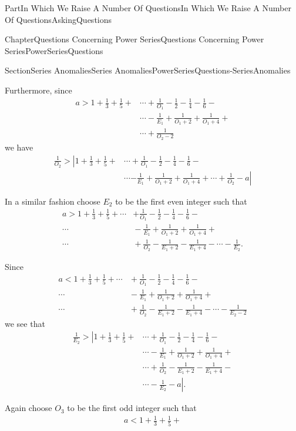 \documentclass[oneside,10pt,]{book}
\numberwithin{equation}{part}
\newcommand{\lt}{<}
\newcommand{\gt}{>}
\newcommand{\amp}{&}
\begin{document}
\begin{partptx}{Part}{In Which We Raise A Number Of Questions}{}{In Which We Raise A Number Of Questions}{}{}{AskingQuestions}
\begin{chapterptx}{Chapter}{Questions Concerning Power Series}{}{Questions Concerning Power Series}{}{}{PowerSeriesQuestions}
\begin{sectionptx}{Section}{Series Anomalies}{}{Series Anomalies}{}{}{PowerSeriesQuestions-SeriesAnomalies}
%
\par
Furthermore, since%
\begin{align*}
a\gt 1+\frac{1}{3}+\frac{1}{5}+\amp{}\cdots+\frac{1}{O_1}-\frac{1}{2}-\frac{1}{4}-
\frac{1}{6}-\\
\amp{}\cdots-\frac{1}{E_1}+\frac{1}{O_1+2}+\frac{1}{O_1+4}+\\
\amp{}\cdots+ \frac{1}{O_2-2}
\end{align*}
we have%
\begin{align*}
\frac{1}{O_2} \gt \left|1+\frac{1}{3}+\frac{1}{5}+\right.\amp{}\cdots+\frac{1}{O_1}-\frac{1}{2}-\frac{1}{4}- \frac{1}{6}-\\
\amp\cdots \left.-\frac{1}{E_1}+\frac{1}{O_1+2}+\frac{1}{O_1+4}+\cdots+ \frac{1}{O_2}-a\right|
\end{align*}
%
\par
In a similar fashion choose \(E_2\) to be the first even integer such that%
\begin{align*}
a\gt 1+\frac{1}{3}+\frac{1}{5}+\cdots\amp +\frac{1}{O_1}-\frac{1}{2}- \frac{1}{4}-\frac{1}{6}-\\
\cdots\amp{} -\frac{1}{E_1}+ \frac{1}{O_1+2}+\frac{1}{O_1+4}+\\
\cdots\amp{}+\frac{1}{O_2}-\frac{1}{E_1+2}-\frac{1}{E_1+4}- \cdots{}-\frac{1}{E_2}\text{.}
\end{align*}
%
\par
Since%
\begin{align*}
a\lt 1+\frac{1}{3}+\frac{1}{5} +\cdots\amp{}+\frac{1}{O_1}-\frac{1}{2}- \frac{1}{4}-\frac{1}{6}-\\
\cdots\amp{}-\frac{1}{E_1}+ \frac{1}{O_1+2}+\frac{1}{O_1+4}+\\
\cdots\amp{}+\frac{1}{O_2}- \frac{1}{E_1+2}-\frac{1}{E_1+4}-\cdots-\frac{1}{E_2-2}
\end{align*}
we see that%
\begin{align*}
\frac{1}{E_2} \gt{}
\left|1+\frac{1}{3}\right.+\frac{1}{5}+
\amp \cdots+\frac{1}{O_1}-\frac{1}{2}-
\frac{1}{4}-\frac{1}{6}-\\
\amp{}\cdots-\frac{1}{E_1} +\frac{1}{O_1+2}+\frac{1}{O_1+4}+\\
\amp{}\cdots+\frac{1}{O_2}-
\frac{1}{E_1+2}-\frac{1}{E_1+4}-\\
\amp{}\cdots-\left.\frac{1}{E_2}-a\right|.
\end{align*}
%
\par
Again choose \(O_3\) to be the first odd integer such that%
\begin{align*}
a\lt 1+\frac{1}{3} +\frac{1}{5}+

\end{align*}
\end{sectionptx}
\end{chapterptx}
\end{partptx}
\end{document}
